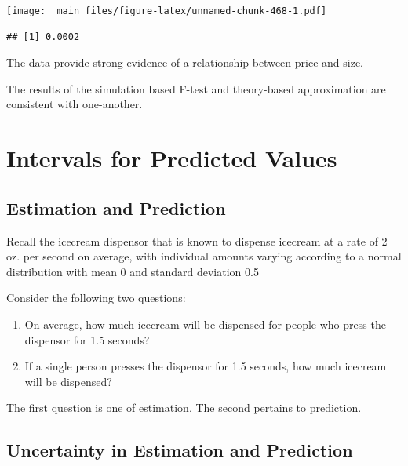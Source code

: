 \documentclass[]{book}
\newenvironment{Shaded}{\begin{snugshade}}{\end{snugshade}}
\newcommand{\KeywordTok}[1]{\textcolor[rgb]{0.13,0.29,0.53}{\textbf{#1}}}
\newcommand{\StringTok}[1]{\textcolor[rgb]{0.31,0.60,0.02}{#1}}
\newcommand{\OperatorTok}[1]{\textcolor[rgb]{0.81,0.36,0.00}{\textbf{#1}}}
\newcommand{\NormalTok}[1]{#1}
\begin{document}
\texttt{[image: \_main\_files/figure-latex/unnamed-chunk-468-1.pdf]}

\begin{Shaded}
\end{Shaded}

\begin{verbatim}
## [1] 0.0002
\end{verbatim}

The data provide strong evidence of a relationship between price and
size.

The results of the simulation based F-test and theory-based
approximation are consistent with one-another.

\section{Intervals for Predicted
Values}\label{intervals-for-predicted-values}

\subsection{Estimation and Prediction}\label{estimation-and-prediction}

Recall the icecream dispensor that is known to dispense icecream at a
rate of 2 oz. per second on average, with individual amounts varying
according to a normal distribution with mean 0 and standard deviation
0.5

Consider the following two questions:

\begin{enumerate}
\def\labelenumi{\arabic{enumi}.}
\item
  On average, how much icecream will be dispensed for people who press
  the dispensor for 1.5 seconds?
\item
  If a single person presses the dispensor for 1.5 seconds, how much
  icecream will be dispensed?
\end{enumerate}

The first question is one of estimation. The second pertains to
prediction.

\subsection{Uncertainty in Estimation and
Prediction}\label{uncertainty-in-estimation-and-prediction}
\end{document}
